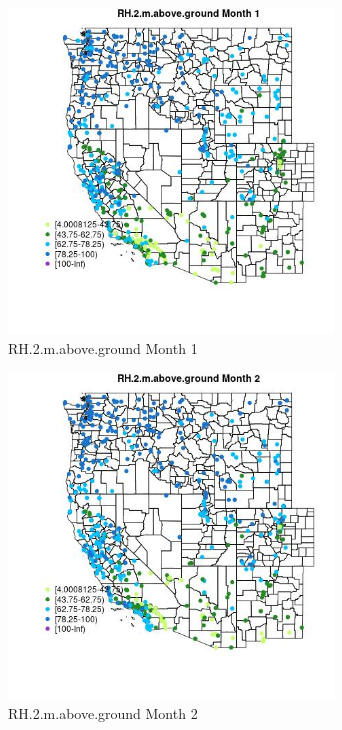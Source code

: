 \begin{figure} 
\centering  
\includegraphics[width=0.77\textwidth]{Code_Outputs/Report_ML_input_PM25_Step4_part_e_de_duplicated_aves_compiled_2019-05-14wNAs_MapObsMo1RH2maboveground.jpg} 
\caption{\label{fig:Report_ML_input_PM25_Step4_part_e_de_duplicated_aves_compiled_2019-05-14wNAsMapObsMo1RH2maboveground}RH.2.m.above.ground Month 1} 
\end{figure} 
 

\begin{figure} 
\centering  
\includegraphics[width=0.77\textwidth]{Code_Outputs/Report_ML_input_PM25_Step4_part_e_de_duplicated_aves_compiled_2019-05-14wNAs_MapObsMo2RH2maboveground.jpg} 
\caption{\label{fig:Report_ML_input_PM25_Step4_part_e_de_duplicated_aves_compiled_2019-05-14wNAsMapObsMo2RH2maboveground}RH.2.m.above.ground Month 2} 
\end{figure} 
 

